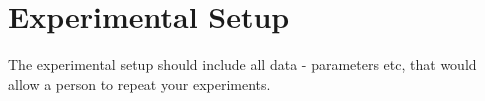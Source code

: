 \section{Experimental Setup}

The experimental setup should include all data - parameters etc, that would allow a person to repeat your experiments. 
  

